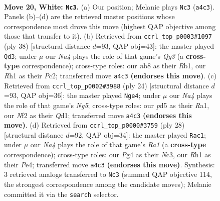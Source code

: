 \documentclass[11pt]{article}
\begin{document}
\clearpage

\begin{figure}[p]\centering
\begin{subfigure}{0.46\textwidth}\centering
\resizebox{\linewidth}{!}{%
\newchessgame
\chessboard[
  setfen={rnb3kr/3n4/2p1p3/pp1p2qp/N2P2P1/8/PPP2NQP/1K1R1B1R w - - 0 20},
  showmover=false,
  pgfstyle=straightmove, color=movearrow, markmove={a4-c3}
]}
\caption{}
\end{subfigure}\hfill
\begin{subfigure}{0.46\textwidth}\centering
\resizebox{\linewidth}{!}{%
\newchessgame
\chessboard[
  setfen={6rk/2q1bppp/r1p1pn2/3p4/3BPP2/1PN3Q1/2P3PP/1R3R1K w - - 0 20},
  showmover=false,
  pgfstyle=straightmove, color=movearrow, markmove={g3-d3}
]}
\caption{}
\end{subfigure}
\\[4pt]
\begin{subfigure}{0.46\textwidth}\centering
\resizebox{\linewidth}{!}{%
\newchessgame
\chessboard[
  setfen={r1b2k1r/pp1n1pp1/2p2n1p/4p1N1/P1q5/2N3P1/3PPPBP/R2Q1RK1 w - - 0 13},
  showmover=false,
  pgfstyle=straightmove, color=movearrow, markmove={g5-e4}
]}
\caption{}
\end{subfigure}\hfill
\begin{subfigure}{0.46\textwidth}\centering
\resizebox{\linewidth}{!}{%
\newchessgame
\chessboard[
  setfen={r3k2r/1b3ppp/p3pn2/1pq5/4P3/1BN5/PP2QPPP/R4RK1 w kq - 2 15},
  showmover=false,
  pgfstyle=straightmove, color=movearrow, markmove={a1-c1}
]}
\caption{}
\end{subfigure}
\caption{\textbf{Move 20, White: \texttt{Nc3}.} (a) Our position; Melanie plays \texttt{Nc3} (\texttt{a4c3}). Panels (b)--(d) are the retrieved master positions whose correspondence most drove this move (highest QAP objective among those that transfer to it). (b) Retrieved from \texttt{ccrl\_top\_p0003\#1097} (ply 38) [structural distance $d$=93, QAP obj=43]: the master played \texttt{Qd3}; under $\mu$ our \emph{Na4} plays the role of that game's \emph{Qg3} (a \textbf{cross-type} correspondence); cross-type roles: our \emph{n}b8 as their \emph{R}b1, our \emph{R}h1 as their \emph{P}c2; transferred move \texttt{a4c3} \textbf{(endorses this move)}. (c) Retrieved from \texttt{ccrl\_top\_p0002\#3988} (ply 24) [structural distance $d$=93, QAP obj=36]: the master played \texttt{Nge4}; under $\mu$ our \emph{Na4} plays the role of that game's \emph{Ng5}; cross-type roles: our \emph{p}d5 as their \emph{R}a1, our \emph{N}f2 as their \emph{Q}d1; transferred move \texttt{a4c3} \textbf{(endorses this move)}. (d) Retrieved from \texttt{ccrl\_top\_p0000\#3759} (ply 28) [structural distance $d$=92, QAP obj=34]: the master played \texttt{Rac1}; under $\mu$ our \emph{Na4} plays the role of that game's \emph{Ra1} (a \textbf{cross-type} correspondence); cross-type roles: our \emph{P}g4 as their \emph{N}c3, our \emph{R}h1 as their \emph{P}e4; transferred move \texttt{a4c3} \textbf{(endorses this move)}. Synthesis: 3 retrieved analogs transferred to \texttt{Nc3} (summed QAP objective 114, the strongest correspondence among the candidate moves); Melanie committed it via the \texttt{search} selector.}
\label{fig:thought-m38}
\end{figure}
\end{document}

